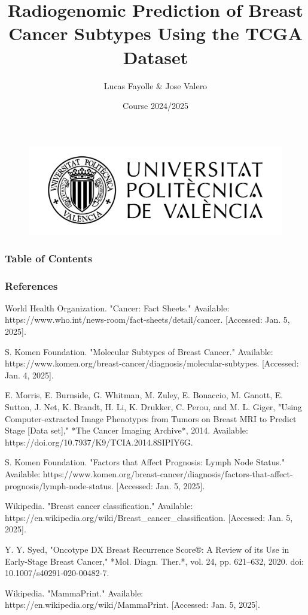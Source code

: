 \documentclass[10pt]{beamer}
\title[Project 4]{Radiogenomic Prediction of Breast Cancer Subtypes Using the TCGA Dataset}
\author[Biomedical Data Science]{\normalsize Lucas Fayolle \& Jose Valero}
\institute[BDS]{Biomedical Data Science \\ (ETSINF - UPV)}
\date[2024/2025]{Course 2024/2025}
\begin{document}

\begin{frame}
	\begin{figure}
		\includegraphics[width=0.45\linewidth]{img/upv_logo.png}
	\end{figure}
	\titlepage
\end{frame}


\begin{frame}
	\frametitle{Table of Contents}
	\tableofcontents 
\end{frame}








\begin{frame}
    \frametitle{References}
    \scriptsize
    \begin{thebibliography}{99}
 World Health Organization. "Cancer: Fact Sheets." Available: https://www.who.int/news-room/fact-sheets/detail/cancer. [Accessed: Jan. 5, 2025].

 S. Komen Foundation. "Molecular Subtypes of Breast Cancer." Available: https://www.komen.org/breast-cancer/diagnosis/molecular-subtypes. [Accessed: Jan. 4, 2025].

 E. Morris, E. Burnside, G. Whitman, M. Zuley, E. Bonaccio, M. Ganott, E. Sutton, J. Net, K. Brandt, H. Li, K. Drukker, C. Perou, and M. L. Giger, "Using Computer-extracted Image Phenotypes from Tumors on Breast MRI to Predict Stage [Data set]," *The Cancer Imaging Archive*, 2014. Available: https://doi.org/10.7937/K9/TCIA.2014.8SIPIY6G.

 S. Komen Foundation. "Factors that Affect Prognosis: Lymph Node Status." Available: https://www.komen.org/breast-cancer/diagnosis/factors-that-affect-prognosis/lymph-node-status. [Accessed: Jan. 5, 2025].

 Wikipedia. "Breast cancer classification." Available: https://en.wikipedia.org/wiki/Breast\_cancer\_classification. [Accessed: Jan. 5, 2025].

 Y. Y. Syed, "Oncotype DX Breast Recurrence Score®: A Review of its Use in Early-Stage Breast Cancer," *Mol. Diagn. Ther.*, vol. 24, pp. 621–632, 2020. doi: 10.1007/s40291-020-00482-7.

 Wikipedia. "MammaPrint." Available: https://en.wikipedia.org/wiki/MammaPrint. [Accessed: Jan. 5, 2025].
    \end{thebibliography}
\end{frame}
\end{document}
